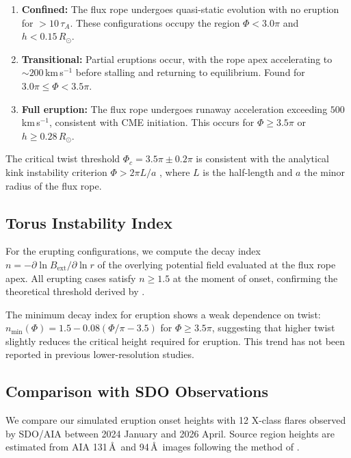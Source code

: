 \documentclass[twocolumn]{aastex631}
\begin{document}
\begin{enumerate}
\item \textbf{Confined:} The flux rope undergoes quasi-static evolution with no
  eruption for $> 10\,\tau_A$. These configurations occupy the region
  $\Phi < 3.0\pi$ and $h < 0.15\,R_\odot$.
\item \textbf{Transitional:} Partial eruptions occur, with the rope apex
  accelerating to $\sim 200$\,km\,s$^{-1}$ before stalling and returning to
  equilibrium. Found for $3.0\pi \leq \Phi < 3.5\pi$.
\item \textbf{Full eruption:} The flux rope undergoes runaway acceleration
  exceeding $500$\,km\,s$^{-1}$, consistent with CME initiation.
  This occurs for $\Phi \geq 3.5\pi$ or $h \geq 0.28\,R_\odot$.
\end{enumerate}

The critical twist threshold $\Phi_c = 3.5\pi \pm 0.2\pi$ is consistent with
the analytical kink instability criterion $\Phi > 2\pi L/a$ \citep{Hood1981},
where $L$ is the half-length and $a$ the minor radius of the flux rope.

\subsection{Torus Instability Index}
\label{sec:torus}

For the erupting configurations, we compute the decay index
$n = -\partial \ln B_\mathrm{ext} / \partial \ln r$ of the overlying potential field
evaluated at the flux rope apex. All erupting cases satisfy $n \geq 1.5$ at the
moment of onset, confirming the theoretical threshold derived by \citet{Kliem2006}.

The minimum decay index for eruption shows a weak dependence on twist:
$n_\mathrm{min}(\Phi) = 1.5 - 0.08(\Phi/\pi - 3.5)$ for $\Phi \geq 3.5\pi$,
suggesting that higher twist slightly reduces the critical height required for
eruption. This trend has not been reported in previous lower-resolution studies.

\subsection{Comparison with SDO Observations}
\label{sec:obs}

We compare our simulated eruption onset heights with 12 X-class flares observed
by SDO/AIA between 2024 January and 2026 April. Source region heights are estimated
from AIA 131\,\AA\ and 94\,\AA\ images following the method of \citet{Zuccarello2015}.
\end{document}

